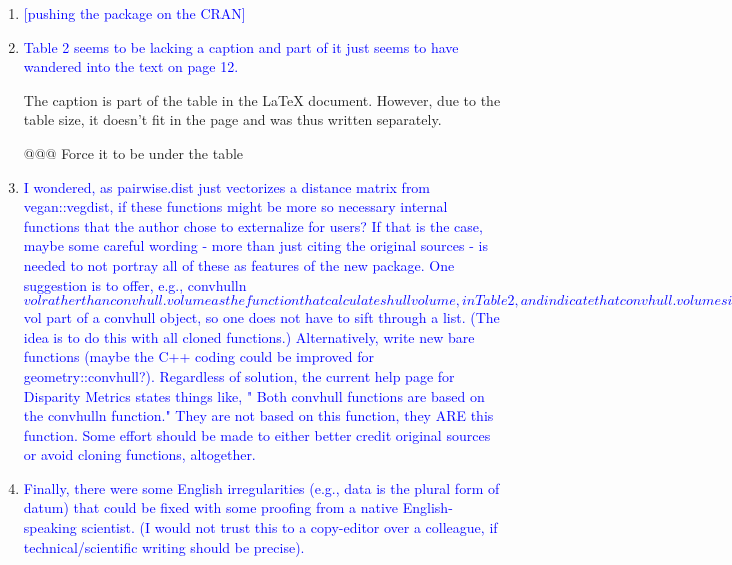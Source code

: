 \documentclass[12pt,letterpaper]{article}
\begin{document}
\begin{enumerate}

\item{\textcolor{blue}{[pushing the package on the CRAN]}}

\item{\textcolor{blue}{Table 2 seems to be lacking a caption and part of it just seems to have wandered into the text on page 12. }}

The caption is part of the table in the LaTeX document.
However, due to the table size, it doesn't fit in the page and was thus written separately.

@@@ Force it to be under the table


\item{\textcolor{blue}{I wondered, as pairwise.dist just vectorizes a distance matrix from vegan::vegdist, if these functions might be more so necessary internal functions that the author chose to externalize for users? 
If that is the case, maybe some careful wording - more than just citing the original sources - is needed to not portray all of these as features of the new package.
One suggestion is to offer, e.g., convhulln$vol rather than convhull.volume as the function that calculates hull volume, in Table 2, and indicate that convhull.volume similarly returns the $vol part of a convhull object, so one does not have to sift through a list. 
(The idea is to do this with all cloned functions.) 
Alternatively, write new bare functions (maybe the C++ coding could be improved for geometry::convhull?).
Regardless of solution, the current help page for Disparity Metrics states things like, " Both convhull functions are based on the convhulln function."  They are not based on this function, they ARE this function.  Some effort should be made to either better credit original sources or avoid cloning functions, altogether.}}

\item{\textcolor{blue}{Finally, there were some English irregularities (e.g., data is the plural form of datum) that could be fixed with some proofing from a native English-speaking scientist. (I would not trust this to a copy-editor over a colleague, if technical/scientific writing should be precise).}}

\end{enumerate}
\end{document}
